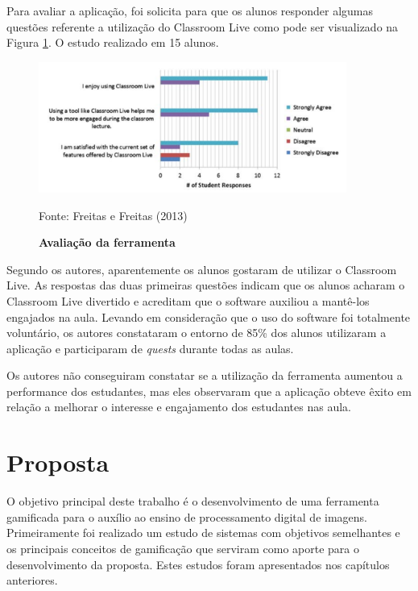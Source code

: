 \documentclass[
	12pt,				%
	oneside,			%
	a4paper,			%
	english,			%
	french,				%
	spanish,			%
	brazil,				%
	]{abntex2}
\begin{document}
Para avaliar a aplicação, foi solicita para que os alunos responder algumas questões referente a utilização do Classroom Live como pode ser visualizado na Figura \ref{fig:classroom_avaliacao}. O estudo realizado em 15 alunos.

\begin{figure}[ht]
\centering
\caption{\textbf{Avaliação da ferramenta}}
\includegraphics[width=0.9\textwidth]{imagens/classroom_avaliacao.png}

Fonte: Freitas e Freitas (2013)
\label{fig:classroom_avaliacao}
\end{figure}

Segundo os autores, aparentemente os alunos gostaram de utilizar o Classroom Live. As respostas das duas primeiras questões indicam que os alunos acharam o Classroom Live divertido e acreditam que o software auxiliou a mantê-los engajados na aula. Levando em consideração que o uso do software foi totalmente voluntário, os autores constataram o entorno de 85\% dos alunos utilizaram a aplicação e participaram de \textit{quests} durante todas as aulas. 

Os autores não conseguiram constatar se a utilização da ferramenta aumentou a performance dos estudantes, mas eles observaram que a aplicação obteve êxito em relação a melhorar o interesse e engajamento dos estudantes nas aula.

\chapter{Proposta} 

O objetivo principal deste trabalho é o desenvolvimento de uma ferramenta gamificada para o auxílio ao ensino de processamento digital de imagens. Primeiramente foi realizado um estudo de sistemas com objetivos semelhantes e os principais conceitos de gamificação que serviram como aporte para o desenvolvimento da proposta. Estes estudos foram apresentados nos capítulos anteriores.
    
\end{document}
